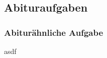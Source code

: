 \documentclass[a4paper,12pt]{article}
\begin{document}
\subsection{Abituraufgaben}
\subsubsection{Abiturähnliche Aufgabe}

\question asdf
\end{document}
